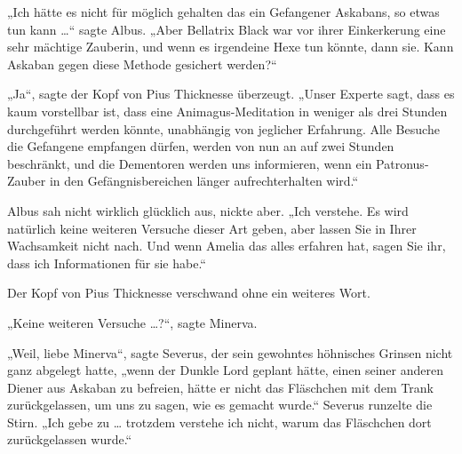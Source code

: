 „Ich hätte es nicht für möglich gehalten das ein Gefangener Askabans, so etwas tun kann …“ sagte Albus.
„Aber Bellatrix Black war vor ihrer Einkerkerung eine sehr mächtige Zauberin, und wenn es irgendeine Hexe tun könnte, dann sie. Kann Askaban gegen diese Methode gesichert werden?“

„Ja“, sagte der Kopf von Pius Thicknesse überzeugt.
„Unser Experte sagt, dass es kaum vorstellbar ist, dass eine Animagus-Meditation in weniger als drei Stunden durchgeführt werden könnte, unabhängig von jeglicher Erfahrung. Alle Besuche die Gefangene empfangen dürfen, werden von nun an auf zwei Stunden beschränkt, und die Dementoren werden uns informieren, wenn ein Patronus-Zauber in den Gefängnisbereichen länger aufrechterhalten wird.“

Albus sah nicht wirklich glücklich aus, nickte aber.
„Ich verstehe. Es wird natürlich keine weiteren Versuche dieser Art geben, aber lassen Sie in Ihrer Wachsamkeit nicht nach. Und wenn Amelia das alles erfahren hat, sagen Sie ihr, dass ich Informationen für sie habe.“

Der Kopf von Pius Thicknesse verschwand ohne ein weiteres Wort.

„Keine weiteren Versuche …?“, sagte Minerva.

„Weil, liebe Minerva“, sagte Severus, der sein gewohntes höhnisches Grinsen nicht ganz abgelegt hatte, „wenn der Dunkle Lord geplant hätte, einen seiner anderen Diener aus Askaban zu befreien, hätte er nicht das Fläschchen mit dem Trank zurückgelassen, um uns zu sagen, wie es gemacht wurde.“ Severus runzelte die Stirn.
„Ich gebe zu … trotzdem verstehe ich nicht, warum das Fläschchen dort zurückgelassen wurde.“

